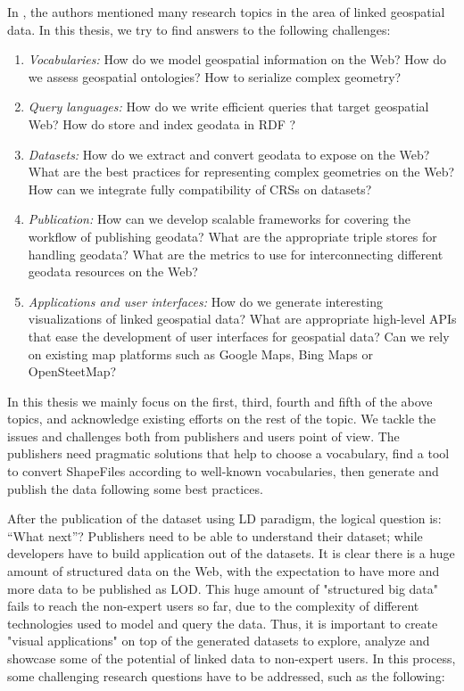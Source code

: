 In \cite{koubarakis12}, the authors mentioned many research topics in the area of linked geospatial data. In this thesis, we try to find answers to the following challenges:

\begin{enumerate}

\item \textit{Vocabularies:} How do we model geospatial information on the Web? How do we assess geospatial ontologies? How to serialize complex geometry? 
\item \textit{Query languages:} How do we write efficient queries that target geospatial Web? How do store and index geodata in RDF ?
\item \textit{Datasets:} How do we extract and convert geodata to expose on the Web? What are the best practices for representing complex geometries on the Web? How can we integrate fully compatibility of CRSs on datasets? 
\item \textit{Publication:} How can we develop scalable frameworks for covering the workflow of publishing geodata? What are the appropriate triple stores for handling geodata? What are the metrics to use for interconnecting different geodata resources on the Web?  
\item \textit{Applications and user interfaces:} How do we generate interesting visualizations of linked geospatial data? What are appropriate high-level APIs that ease the development of user interfaces for geospatial data? Can we rely on existing map platforms such as Google Maps, Bing Maps or OpenSteetMap?
\end{enumerate}

In this thesis we mainly focus on the first, third, fourth and fifth of the above topics, and acknowledge existing efforts on the rest of the topic. We tackle the issues and challenges both from publishers and users point of view. The publishers need pragmatic solutions that help to choose a vocabulary, find a tool to convert ShapeFiles according to well-known vocabularies, then generate and publish the data following some best practices.


After the publication of the dataset using LD paradigm, the logical question is: ``What next''? Publishers need to be able to understand their dataset; while developers have to build application out of the datasets. It is clear there is a huge amount of structured data on the Web, with the expectation to have more and more 
data to be published as LOD. This huge amount of "structured big data" fails to reach the non-expert users 
so far, due to the complexity of different technologies used to model and query the data. Thus, it is 
important to create "visual applications" on top of the generated datasets to explore, analyze and showcase 
some of the potential of linked data to non-expert users. In this process, some challenging research questions have to be addressed, such as the following:

